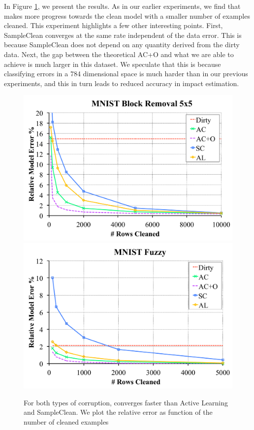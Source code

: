 In Figure \ref{mnist}, we present the results.
As in our earlier experiments, we find that \sys makes more progress towards the clean model with a smaller number of examples cleaned.
This experiment highlights a few other interesting points.
First, SampleClean converges at the same rate independent of the data error.
This is because SampleClean does not depend on any quantity derived from the dirty data.
Next, the gap between the theoretical AC+O and what we are able to achieve is much larger in this dataset.
We speculate that this is because classifying errors in a 784 dimensional space is much harder than in our previous experiments, and this in turn leads to reduced accuracy in impact estimation.


\begin{figure}[ht]
\centering
 \includegraphics[scale=0.16]{exp/exp7a.pdf}
 \includegraphics[scale=0.16]{exp/exp7b.pdf}
 \caption{For both types of corruption, \sys converges faster than Active Learning and SampleClean. We plot the relative error as function of the number of cleaned examples \label{mnist}}
\end{figure}

